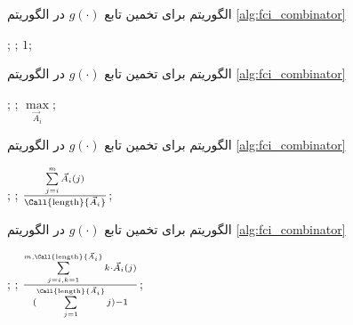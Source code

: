 \begin{algorithm}[t]
\caption{الگوریتم  برای تخمین تابع $g(\cdot)$ در الگوریتم \ref{alg:fci_combinator}}\label{alg:g:const-one}
\begin{latin}
\begin{algorithmic}[1]
		\State {};
		\State {};
	\Else
		\State \Return $1$;
	\EndIf
\EndProcedure
\end{algorithmic}
\end{latin}
\end{algorithm}

\begin{algorithm}[t]
\caption{الگوریتم  برای تخمین تابع $g(\cdot)$ در الگوریتم \ref{alg:fci_combinator}}\label{alg:g:max}
\begin{latin}
\begin{algorithmic}[1]
		\State {};
		\State {};
	\Else
		\State \Return $\max\limits_{\vec{A}_i}$;
	\EndIf
\EndProcedure
\end{algorithmic}
\end{latin}
\end{algorithm}

\begin{algorithm}[t]
\caption{الگوریتم  برای تخمین تابع $g(\cdot)$ در الگوریتم \ref{alg:fci_combinator}}\label{alg:g:mean}
\begin{latin}
\begin{algorithmic}[1]
		\State {};
		\State {};
	\Else
		\State \Return ${\sum\limits_{j=i}^m \vec{A}_i(j) \over \Call{\text{length}}{\vec{A}_i}}$;
	\EndIf
\EndProcedure
\end{algorithmic}
\end{latin}
\end{algorithm}

\begin{algorithm}[t]
\caption{الگوریتم  برای تخمین تابع $g(\cdot)$ در الگوریتم \ref{alg:fci_combinator}}\label{alg:g:k-mean}
\begin{latin}
\begin{algorithmic}[1]
		\State {};
		\State {};
	\Else
		\State \Return ${\sum\limits_{j=i, k = 1}^{m, \Call{\text{length}}{\vec{A}_i}}  k \cdot \vec{A}_i(j) \over {(\sum\limits_{j=1}^{\Call{\text{length}}{\vec{A}_i}} j) - 1}}$;
	\EndIf
\EndProcedure
\end{algorithmic}
\end{latin}
\end{algorithm}

